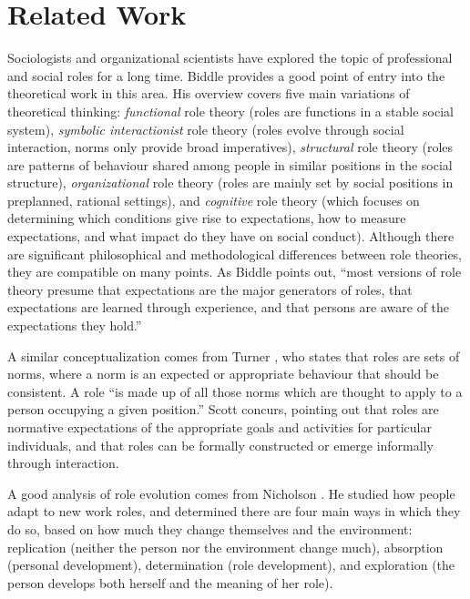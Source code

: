 \documentclass[10pt, conference, compsocconf]{IEEEtran}
\begin{document}

\section{Related Work}

Sociologists and organizational scientists have explored the topic of professional and social roles for a long time. Biddle \cite{Biddle1986} provides a good point of entry into the theoretical work in this area. His overview covers five main variations of theoretical thinking: \emph{functional} role theory (roles are functions in a stable social system), \emph{symbolic interactionist} role theory (roles evolve through social interaction, norms only provide broad imperatives), \emph{structural} role theory (roles are patterns of behaviour shared among people in similar positions in the social structure), \emph{organizational} role theory (roles are mainly set by social positions in preplanned, rational settings), and \emph{cognitive} role theory (which focuses on determining which conditions give rise to expectations, how to measure expectations, and what impact do they have on social conduct). Although there are significant philosophical and methodological differences between role theories, they are compatible on many points. As Biddle points out, ``most versions of role theory presume that expectations are the major generators of roles, that expectations are learned through experience, and that persons are aware of the expectations they hold.''

A similar conceptualization comes from Turner \cite{Turner1956}, who states that roles are sets of norms, where a norm is an expected or appropriate behaviour that should be consistent. A role ``is made up of all those norms which are thought to apply to a person occupying a given position.'' Scott \cite{Scott2008} concurs, pointing out that roles are normative expectations of the appropriate goals and activities for particular individuals, and that roles can be formally constructed or emerge informally through interaction.

A good analysis of role evolution comes from Nicholson \cite{Nicholson1984}. He studied how people adapt to new work roles, and determined there are four main ways in which they do so, based on how much they change themselves and the environment: replication (neither the person nor the environment change much), absorption (personal development), determination (role development), and exploration (the person develops both herself and the meaning of her role).
\end{document}
